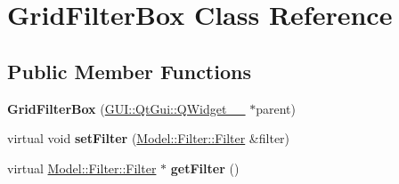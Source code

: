 \hypertarget{classGUI_1_1GridFilterBox}{}\section{Grid\+Filter\+Box Class Reference}
\label{classGUI_1_1GridFilterBox}
\subsection*{Public Member Functions}
\begin{DoxyCompactItemize}
\item 
\hypertarget{classGUI_1_1GridFilterBox_af3b9eafafad03458941e55f562939575}{}{\bfseries Grid\+Filter\+Box} (\hyperlink{classGUI_1_1QtGui_1_1QWidget____10}{G\+U\+I\+::\+Qt\+Gui\+::\+Q\+Widget\+\_\+\+\_} $\ast$parent)\label{classGUI_1_1GridFilterBox_af3b9eafafad03458941e55f562939575}

\item 
\hypertarget{classGUI_1_1GridFilterBox_ad7c0ee00fe3faac7942d75eec2a5342b}{}virtual void {\bfseries set\+Filter} (\hyperlink{classModel_1_1Filter_1_1Filter}{Model\+::\+Filter\+::\+Filter} \&filter)\label{classGUI_1_1GridFilterBox_ad7c0ee00fe3faac7942d75eec2a5342b}

\item 
\hypertarget{classGUI_1_1GridFilterBox_acef2029a93f4ab3a538cdb643b9c2613}{}virtual \hyperlink{classModel_1_1Filter_1_1Filter}{Model\+::\+Filter\+::\+Filter} $\ast$ {\bfseries get\+Filter} ()\label{classGUI_1_1GridFilterBox_acef2029a93f4ab3a538cdb643b9c2613}

\end{DoxyCompactItemize}
